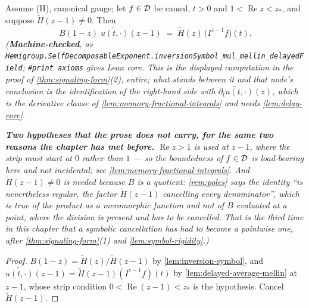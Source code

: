 \begin{lemma}\label{lem:signaling-mellin-form}
\leanok
Assume (H), canonical gauge; let $f \in \mathcal{D}$ be causal, $t > 0$ and
$1 < \operatorname{Re} z < z_*$, and suppose $\tilde H(z-1) \ne 0$. Then
\[
  B(1-z)\;\widetilde{u(t,\cdot)}(z-1) \;=\; \tilde H(z)\,\bigl(I^{z-1}f\bigr)(t).
\]
\statusT\quad\emph{(\textbf{Machine-checked}, as
\texttt{Hemigroup.SelfDecomposableExponent.inversionSymbol\_mul\_mellin\_delayedField};
\texttt{\#print axioms} gives Lean core. This is the displayed computation in
the proof of \ref{thm:signaling-form}(2), entire; what stands between it and that node's
conclusion is the identification of the right-hand side with
$\widetilde{\partial_t u(t,\cdot)}(z)$, which is the derivative clause of
\ref{lem:memory-fractional-integrals} and needs \ref{lem:delay-core}.}

\emph{\textbf{Two hypotheses that the prose does not carry, for the same two reasons the chapter
has met before.} $\operatorname{Re} z > 1$ is used at $z-1$, where the strip must start at $0$
rather than $1$ --- so the boundedness of $f \in \mathcal{D}$ is load-bearing here and not incidental;
see \ref{lem:memory-fractional-integrals}. And $\tilde H(z-1) \ne 0$ is needed because $B$ is a
quotient: \ref{rem:poles} says the identity ``is nevertheless regular, the factor $\tilde H(z-1)$
cancelling every denominator'', which is true of the product as a \emph{meromorphic function} and
not of $B$ evaluated at a point, where the division is present and has to be cancelled. That is
the third time in this chapter that a symbolic cancellation has had to become a pointwise one,
after \ref{thm:signaling-form}(1) and \ref{lem:symbol-rigidity}.)}
\end{lemma}

\begin{proof}
\leanok
{}
$B(1-z) = \tilde H(z)/\tilde H(z-1)$ by \ref{lem:inversion-symbol}, and
$\widetilde{u(t,\cdot)}(z-1) = \tilde H(z-1)(I^{z-1}f)(t)$ by \ref{lem:delayed-average-mellin} at
$z-1$, whose strip condition $0 < \operatorname{Re}(z-1) < z_*$ is the hypothesis. Cancel
$\tilde H(z-1)$.
\end{proof}


